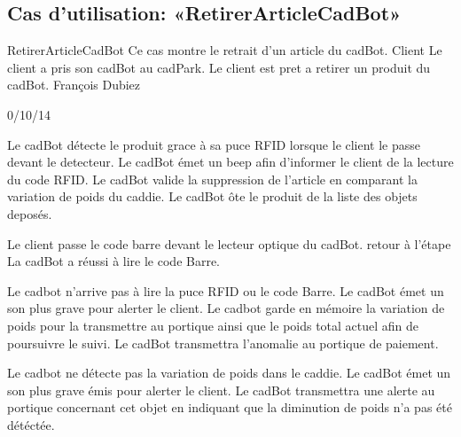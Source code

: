 \subsection{Cas d'utilisation: «RetirerArticleCadBot» }

\startCU
\nom RetirerArticleCadBot
\but Ce cas montre le retrait d'un article du cadBot.
\acteur Client
\precondition Le client a pris son cadBot au cadPark.
\declenchement Le client est pret a retirer un produit du cadBot.
\auteur François Dubiez
\date 30/10/14

\nominal %
\startnominal
\etape[RAC:SA1] Le cadBot détecte le produit grace à sa puce RFID lorsque le client le passe devant le detecteur. 
 Le cadBot émet un beep afin d'informer le client de la lecture du code RFID.
\etape[RAC:SA3] Le cadBot valide la suppression de l'article en comparant la variation de poids du caddie.
\stopnominal
\postcondition Le cadBot ôte le produit de la liste des objets deposés.

\alternatifs %
\startalternatif[RAC:SA1] %
  \etape Le client passe le code barre devant le lecteur optique du cadBot.
  \etape retour à l'étape 
\stopcondition
\postcondition La cadBot a réussi à lire le code Barre.
\stopalternatif

\startalternatif[RAC:SA1]
   \etape Le cadbot n'arrive pas à lire la puce RFID ou le code Barre.
   \etape Le cadBot émet un son plus grave pour alerter le client.
   \etape Le cadbot garde en mémoire la variation de poids pour la transmettre au portique ainsi que le poids total actuel afin de poursuivre le suivi.
\stopcondition
\postcondition Le cadBot transmettra l'anomalie au portique de paiement.
\stopalternatif


\startalternatif[RAC:SA3]
   \etape Le cadbot ne détecte pas la variation de poids dans le caddie.
   \etape Le cadBot émet un son plus grave émis pour alerter le client.
\stopcondition
\postcondition Le cadBot transmettra une alerte au portique concernant cet objet en indiquant que la diminution de poids n'a pas été détéctée.
\stopalternatif

\stopCU
